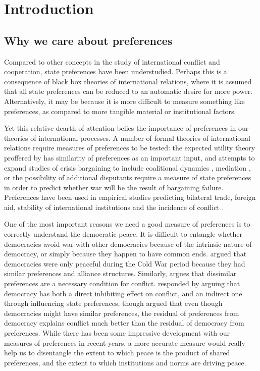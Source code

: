 
\section*{Introduction}

\subsection*{Why we care about preferences}

Compared to other concepts in the study of international conflict and cooperation, state preferences have been understudied. Perhaps this is a consequence of black box theories of international relations, where it is assumed that all state preferences can be reduced to an automatic desire for more power. Alternatively, it may be because it is more difficult to measure something like preferences, as compared to more tangible material or institutional factors.

Yet this relative dearth of attention belies the importance of preferences in our theories of international processes. A number of formal theories of international relations require measures of preferences to be tested: the expected utility theory proffered by \citep{buenodemesquita:1983} has similarity of preferences as an important input, and attempts to expand studies of crisis bargaining to include coalitional dynamics \citep{wolford:2014}, mediation \citep{kydd:2003}, or the possibility of additional disputants \citep{gallop:2017} require a measure of state preferences in order to predict whether war will be the result of bargaining failure. Preferences have been used in empirical studies predicting bilateral trade, foreign aid, stability of international institutions and the incidence of conflict \citep{kastner:2007, derouen:heo:2004, stone:2004, gartzke:2007, braumoeller:2008}. 

One of the most important reasons we need a good measure of preferences is to correctly understand the democratic peace. It is difficult to entangle whether democracies avoid war with other democracies because of the intrinsic nature of democracy, or simply because they happen to have common ends. \citet{farber:gowa:1995} argued that democracies were only peaceful during the Cold War period because they had similar preferences and alliance structures. Similarly, \citet{gartzke:1998} argues that dissimilar preferences are a necessary condition for conflict. \citet{oneal:russett:1999e} responded by arguing that democracy has both a direct inhibiting effect on conflict, and an indirect one through influencing state preferences, though \citet{gartzke:2000} argued that even though democracies might have similar preferences, the residual of preferences from democracy explains conflict much better than the residual of democracy from preferences. While there has been some impressive development with our measures of preferences in recent years, a more accurate measure would really help us to disentangle the extent to which peace is the product of shared preferences, and the extent to which institutions and norms are driving peace.

